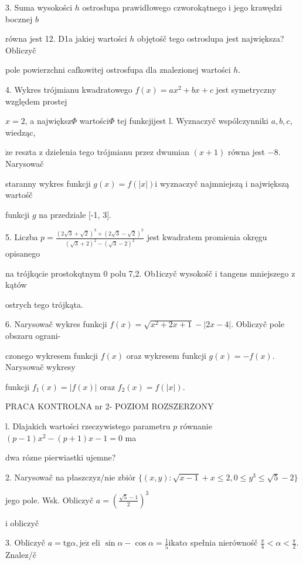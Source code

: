 \documentclass[a4paper,12pt]{article}
\begin{document}
3. Suma wysokości $h$ ostrosłupa prawidłowego czworokątnego $\mathrm{i}$ jego krawędzi bocznej $b$

równa jest 12. D1a jakiej wartości $h$ objętośč tego ostroslupa jest największa? Obliczyč

pole powierzchni cafkowitej ostrosfupa dla znalezionej wartości $h.$

4. Wykres trójmianu kwadratowego $f(x)=ax^{2}+bx+c$ jest symetryczny względem prostej

$x=2$, a największ$\Phi$ wartości$\Phi$ tej funkcjijest l. Wyznaczyč wspólczynniki $a, b, c$, wiedząc,

$\dot{\mathrm{z}}\mathrm{e}$ reszta $\mathrm{z}$ dzielenia tego trójmianu przez dwumian $(x+1)$ równa jest $-8$. Narysowač

staranny wykres funkcji $g(x) = f(|x|) \mathrm{i}$ wyznaczyč najmniejszą $\mathrm{i}$ największą wartośč

funkcji $g$ na przedziale [-1, 3].

5. Liczba $p=\displaystyle \frac{(2\sqrt{3}+\sqrt{2})^{3}+(2\sqrt{3}-\sqrt{2})^{3}}{(\sqrt{3}+2)^{2}-(\sqrt{3}-2)^{2}}$ jest kwadratem promienia okręgu opisanego

na trójkqcie prostokqtnym $0$ polu 7,2. Ob1iczyč wysokośč $\mathrm{i}$ tangens mniejszego $\mathrm{z}$ kątów

ostrych tego trójkąta.

6. Narysowač wykres funkcji $f(x)=\sqrt{x^{2}+2x+1}-|2x-4|$. Obliczyč pole obszaru ograni-

czonego wykresem funkcji $f(x)$ oraz wykresem funkcji $g(x)=-f(x)$. Narysowač wykresy

funkcji $f_{1}(x)=|f(x)|$ oraz $f_{2}(x)=f(|x|).$





PRACA KONTROLNA nr 2- POZIOM ROZSZERZONY

l. Dlajakich wartości rzeczywistego parametru $p$ równanie $(p-1)x^{2}-(p+1)x-1=0$ ma

dwa rózne pierwiastki ujemne?

2. Narysowač na płaszczyz/nie zbiór $\{(x,y):\sqrt{x-1}+x\leq 2,0\leq y^{3}\leq\sqrt{5}-2\}$

jego pole. Wsk. Obliczyč $a=(\displaystyle \frac{\sqrt{5}-1}{2})^{3}$

i obliczyč

3. Obliczyč $a=\mathrm{t}\mathrm{g}\alpha, \mathrm{j}\mathrm{e}\dot{\mathrm{z}}$ eli $\displaystyle \sin\alpha-\cos\alpha=\frac{1}{5}\mathrm{i}\mathrm{k}\mathrm{a}\mathrm{t}\alpha$ spełnia nierównośč $\displaystyle \frac{\pi}{4}<\alpha<\frac{\pi}{2}$. Znalez/č
\end{document}
